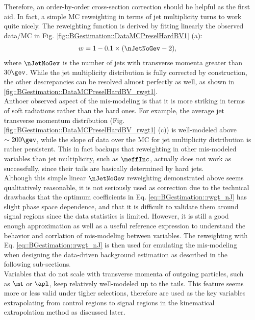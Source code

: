 Therefore, an order-by-order cross-section correction should be helpful as the first aid. In fact, a simple MC reweighting in terms of jet multiplicity turns to work quite nicely. The reweighting function is derived by fitting linearly the observed data/MC in Fig. \ref{fig::BGestimation::DataMCPreselHardBV1} (a):
\begin{equation}
w = 1 - 0.1 \times (\nJetNoGev-2) \label{eq::BGestimation::rwgt_nJ},
\end{equation}
where $\nJetNoGev$ is the number of jets with transverse momenta greater than $30\gev$. While the jet multiplicity distribution is fully corrected by construction, the other descrepancies can be resolved almost perfectly as well, as shown in \ref{fig::BGestimation::DataMCPreselHardBV_rwgt1}. \\

Anthoer observed aspect of the mis-modeling is that it is more striking in terms of soft radiations rather than the hard ones. For example, the average jet transverse momentum distribution (Fig. \ref{fig::BGestimation::DataMCPreselHardBV_rwgt1} (c)) is well-modeled above $\sim 200 \gev$, while the slope of data over the MC for jet multiplicity distribution is rather persistent. This in fact backups that reweighting in other mis-modeled variables than jet multiplicity, such as $\meffInc$, actually does not work as successfully, since their tails are basically determined by hard jets. \\

Although this simple linear $\nJetNoGev$ reweighting demonstrated above seems qualitatively reasonable, it is not seriously used as correction due to the technical drawbacks that the optimum coefficients in Eq. \ref{eq::BGestimation::rwgt_nJ} has slight phase space dependence, and that it is difficult to validate them around signal regions since the data statistics is limited. However, it is still a good enough approximation as well as a useful reference expression to understand the behavior and corrlation of mis-modeling between variables. The reweighting with Eq. \ref{eq::BGestimation::rwgt_nJ} is then used for emulating the mis-modeling when designing the data-driven background estimation as described in the following sub-sections. \\

Variables that do not scale with transverse momenta of outgoing particles, such as $\mt$ or $\apl$, keep relatively well-modeled up to the tails. This feature seems more or less valid under tigher selections, therefore are used as the key variables extrapolating from control regions to signal regions in the kinematical extrapolation method as discussed later.

